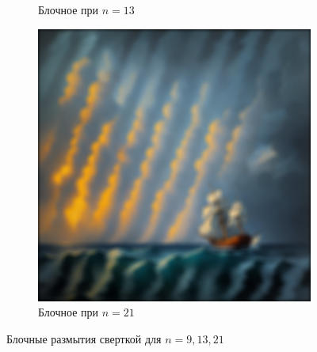 \documentclass[a4paper, 12pt]{article}
\begin{document}
\begin{figure}[H]
\begin{subfigure}{0.30\textwidth}
            \caption{Блочное при $n=13$}
            \label{fig:bl_c2_n=13}
        \end{subfigure}
        \begin{subfigure}{0.30\textwidth}
            \centering
            \includegraphics[width=\linewidth]{bl_c2_n=21.png}
            \caption{Блочное при $n=21$}
            \label{fig:bl_c2_n=21}
        \end{subfigure}
        \caption{Блочные размытия сверткой для $n=9,13,21$}
        \label{fig:blcls}
    \end{figure}
\end{document}
